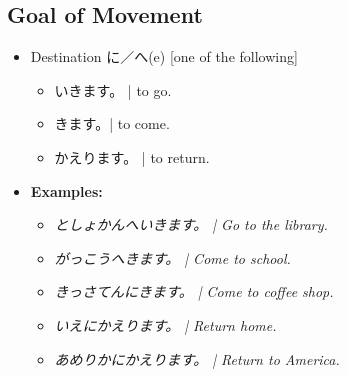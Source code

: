 \documentclass{article}
\begin{document}
\begin{CJK}{UTF8}{min}
\subsection{Goal of Movement}

\begin{itemize}
\item Destination に／へ(e) [one of the following]
\begin{itemize}
\item いきます。 | to go.
\item きます。| to come.
\item かえります。 | to return.
\end{itemize}
\item {\bf Examples:}
\begin{itemize}
\item {\it としょかんへいきます。 | Go to the library.}
\item {\it がっこうへきます。 | Come to school.}
\item {\it きっさてんにきます。 | Come to coffee shop.}
\item {\it いえにかえります。 | Return home.}
\item {\it あめりかにかえります。 | Return to America.}
\end{itemize}
\end{itemize}

\end{CJK}
\end{document}
